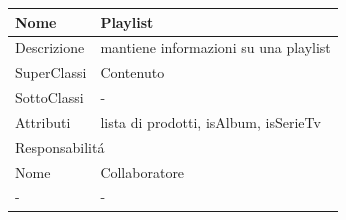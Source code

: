 \begin{center} %
    \begin{longtable}{ |p{3cm}|p{3cm}|p{3cm}|p{3cm}| }
        \hline
        Nome & \multicolumn{3}{|p{9cm}|}{Playlist} \\\hline
        Descrizione & \multicolumn{3}{|p{9cm}|}{mantiene informazioni su una playlist} \\\hline
        SuperClassi & \multicolumn{3}{|p{9cm}|}{Contenuto} \\\hline
        SottoClassi & \multicolumn{3}{|p{9cm}|}{-} \\\hline
        Attributi & \multicolumn{3}{|p{9cm}|}{lista di prodotti, isAlbum, isSerieTv} \\\hline
        \multicolumn{4}{|p{12cm}|}{Responsabilit\'a} \\\hline %
        \multicolumn{2}{|p{6cm}|}{Nome} & \multicolumn{2}{|p{6cm}|}{Collaboratore} \\\hline
        \multicolumn{2}{|p{6cm}|}{-} & \multicolumn{2}{|p{6cm}|}{-} \\\hline
    \end{longtable}
\end{center}

